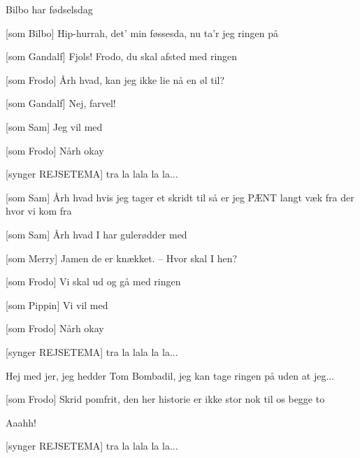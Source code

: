 \documentclass[a4paper,11pt]{article}
\begin{document}
\begin{sketch}
   Bilbo har fødselsdag
  
   

  [som Bilbo] Hip-hurrah, det' min føssesda, nu ta'r jeg
  ringen på
  
  

  [som Gandalf] Fjols! Frodo, du skal afsted med ringen
  
  [som Frodo] Årh hvad, kan jeg ikke lie nå en øl til?
  
  [som Gandalf] Nej, farvel!



  [som Sam] Jeg vil med
  
  [som Frodo] Nårh okay
  

   [synger REJSETEMA] tra la lala la la...
  
  [som Sam] Årh hvad hvis jeg tager et skridt til så er jeg
  PÆNT langt væk fra der hvor vi kom fra
  
  
  [som Sam] Årh hvad I har gulerødder med
  
  [som Merry] Jamen de er knækket. -- Hvor skal I hen?
  
  [som Frodo] Vi skal ud og gå med ringen
  
  [som Pippin] Vi vil med
  
  [som Frodo] Nårh okay

    
   [synger REJSETEMA] tra la lala la la...
  
  
   Hej med jer, jeg hedder Tom Bombadil, jeg kan tage ringen
  på uden at jeg...

  [som Frodo] Skrid pomfrit, den her historie er ikke stor
  nok til os begge to 
    
   Aaahh!
  
   [synger REJSETEMA] tra la lala la la...
  

\end{sketch}
\end{document}
